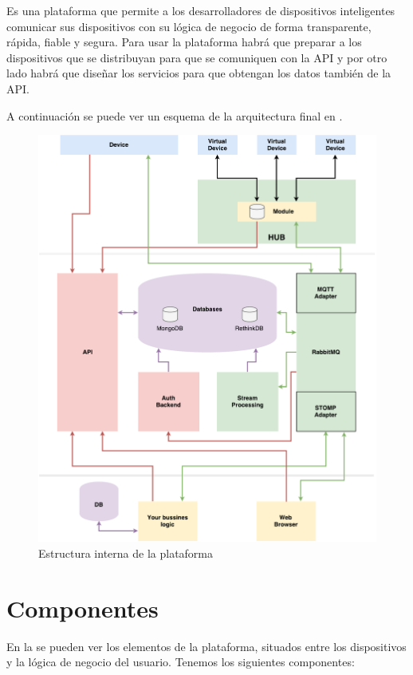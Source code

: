 Es una plataforma que permite a los desarrolladores de dispositivos inteligentes
comunicar sus dispositivos con su lógica de negocio de forma transparente,
rápida, fiable y segura.
Para usar la plataforma habrá que preparar a los dispositivos que se distribuyan
para que se comuniquen con la API y por otro lado habrá que diseñar los
servicios para que obtengan los datos también de la API.

A continuación se puede ver un esquema de la arquitectura final en .

\begin{figure}[htbp]
\centering
\includegraphics[width=\linewidth]{02-arquitectura/figuras/fig002}
\caption{Estructura interna de la plataforma}
\label{fig:figura2}
\end{figure}

\section{Componentes}

En la  se pueden ver los elementos de la plataforma, situados entre los
dispositivos y la lógica de negocio del usuario. Tenemos los siguientes
componentes:

